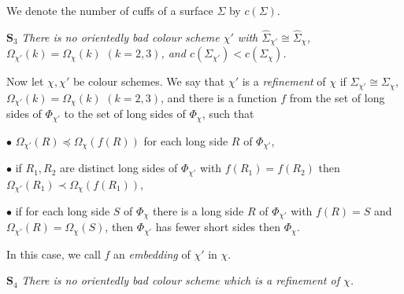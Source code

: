 We denote the number of cuffs of a surface $\Sigma$ by $c(\Sigma)$.

$\mathbf{S}_3$ \textit{There is no orientedly bad colour scheme $\chi'$ with $\hat{\Sigma}_{\chi'}\cong \hat{\Sigma}_\chi$, $\Omega_{\chi'}(k) = \Omega_\chi(k)$ $(k = 2,3)$, and $c(\Sigma_{\chi'}) < c(\Sigma_\chi)$.}

Now let $\chi,\chi'$ be colour schemes. We say that $\chi'$ is a \textit{refinement} of $\chi$ if $\Sigma_{\chi'}\cong \Sigma_\chi$, $\Omega_{\chi'}(k) = \Omega_\chi(k)$ $(k = 2,3)$, and there is a function $f$ from the set of long sides of $\Phi_{\chi'}$ to the set of long sides of $\Phi_\chi$, such that

\hspace*{12pt}$\bullet$ $\Omega_{\chi'}(R)\preceq \Omega_\chi(f(R))$ for each long side $R$ of $\Phi_{\chi'}$,

\hspace*{12pt}$\bullet$ if $R_1,R_2$ are distinct long sides of $\Phi_{\chi'}$ with $f(R_1) = f(R_2)$ then $\Omega_{\chi'}(R_1)\prec \Omega_\chi(f(R_1))$,

\hspace*{12pt}$\bullet$ if for each long side $S$ of $\Phi_\chi$ there is a long side $R$ of $\Phi_{\chi'}$ with $f(R) = S$ and $\Omega_{\chi'}(R) = \Omega_\chi(S)$, then $\Phi_{\chi'}$ has fewer short sides then $\Phi_\chi$.

In this case, we call $f$ an \textit{embedding} of $\chi'$ in $\chi$.

$\mathbf{S}_4$ \textit{There is no orientedly bad colour scheme which is a refinement of $\chi$.}
